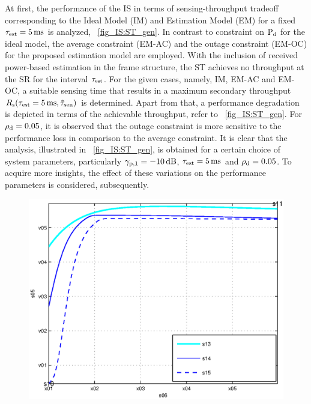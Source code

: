 {At first, the performance of the IS in terms of sensing-throughput tradeoff corresponding to the Ideal Model (IM) and Estimation Model (EM) for a fixed $\tau_{\text{est}} = \SI{5}{ms}$ is analyzed,  \figurename~\ref{fig_IS:ST_gen}. In contrast to constraint on $\text{P}_{\text{d}}$ for the ideal model, the average constraint (EM-AC) and the outage constraint (EM-OC) for the proposed estimation model are employed. With the inclusion of received power-based estimation in the frame structure, the ST achieves no throughput at the SR for the interval $\tau_{\text{est}}$. For the given cases, namely, IM, EM-AC and EM-OC, a suitable sensing time that results in a maximum secondary throughput $R_{\text{s}}(\tau_{\text{est}} = \SI{5}{ms},\tilde{\tau}_{\text{sen}})$ is determined. Apart from that, a performance degradation is depicted in terms of the achievable throughput, refer to \figurename~\ref{fig_IS:ST_gen}. For $\rho_{\text{d}} = 0.05$, it is observed that the outage constraint is more sensitive to the performance loss in comparison to the average constraint. It is clear that the analysis, illustrated in \figurename~\ref{fig_IS:ST_gen}, is obtained for a certain choice of system parameters, particularly ${\gamma}_{\text{p,1}} = -\SI{10}{dB}$, $\tau_{\text{est}} = \SI{5}{ms}$ and $\rho_{\text{d}} = 0.05$. To acquire more insights, the effect of these variations on the performance parameters is considered, subsequently. 

\begin{figure}[!ht]


\centering
\includegraphics[width= \figscale]{figures/fig_opt_thr_vs_SNR_AWGN}
\caption{}
\label{fig_IS:optT_snr}
\end{figure}

}
